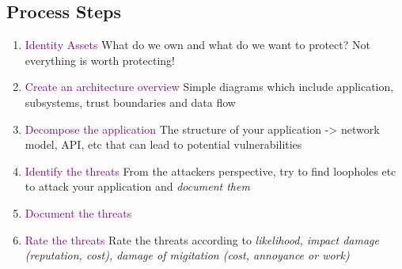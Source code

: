 \documentclass[main.tex,fontsize=8pt,paper=a4,paper=portrait,DIV=calc,]{scrartcl}
\begin{document}
\subsection{Process Steps}
\begin{enumerate}
\item \textcolor{purple}{Identity Assets}\newline
What do we own and what do we want to protect? Not everything is worth protecting!
\item \textcolor{purple}{Create an architecture overview}\newline
  Simple diagrams which include application, subsystems, trust boundaries and data flow
\item \textcolor{purple}{Decompose the application}\newline
  The structure of your application -> network model, API, etc that can lead to potential vulnerabilities
\item \textcolor{purple}{Identify the threats}\newline
  From the attackers perspective, try to find loopholes etc to attack your application and \emph{document them}
\item \textcolor{purple}{Document the threats}\newline
\item \textcolor{purple}{Rate the threats} \newline
  Rate the threats according to \emph{likelihood, impact damage (reputation, cost), damage of migitation (cost, annoyance or work)}
\end{enumerate} 
\end{document}
